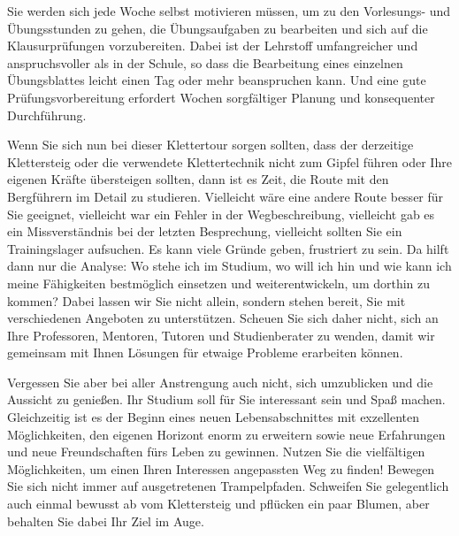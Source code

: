 {    Sie werden sich jede Woche selbst motivieren müssen, um zu den Vorlesungs- und Übungsstunden zu gehen, die Übungsaufgaben zu bearbeiten und sich auf die Klausurprüfungen vorzubereiten. Dabei ist der Lehrstoff umfangreicher und anspruchsvoller als in der Schule, so dass die Bearbeitung eines einzelnen Übungsblattes leicht einen Tag oder mehr beanspruchen kann. Und eine gute Prüfungsvorbereitung erfordert Wochen sorgfältiger Planung und konsequenter Durchführung.

    Wenn Sie sich nun bei dieser Klettertour sorgen sollten, dass der derzeitige Klettersteig oder die verwendete Klettertechnik nicht zum Gipfel führen oder Ihre eigenen Kräfte übersteigen sollten, dann ist es Zeit, die Route mit den Bergführern im Detail zu studieren. Vielleicht wäre eine andere Route besser für Sie geeignet, vielleicht war ein Fehler in der Wegbeschreibung, vielleicht gab es ein Missverständnis bei der letzten Besprechung, vielleicht sollten Sie ein Trainingslager aufsuchen. Es kann viele Gründe geben, frustriert zu sein. Da hilft dann nur die Analyse: Wo stehe ich im Studium, wo will ich hin und wie kann ich meine Fähigkeiten bestmöglich einsetzen und weiterentwickeln, um dorthin zu kommen? Dabei lassen wir Sie nicht allein, sondern stehen bereit, Sie mit verschiedenen Angeboten zu unterstützen. Scheuen Sie sich daher nicht, sich an Ihre Professoren, Mentoren, Tutoren und Studienberater zu wenden, damit wir gemeinsam mit Ihnen Lösungen für etwaige Probleme erarbeiten können.


    Vergessen Sie aber bei aller Anstrengung auch nicht, sich umzublicken und die Aussicht zu genießen. Ihr Studium soll für Sie interessant sein und Spaß machen. Gleichzeitig ist es der Beginn eines neuen Lebensabschnittes mit exzellenten Möglichkeiten, den eigenen Horizont enorm zu erweitern sowie neue Erfahrungen und neue Freundschaften fürs Leben zu gewinnen. Nutzen Sie die vielfältigen Möglichkeiten, um einen Ihren Interessen angepassten Weg zu finden! Bewegen Sie sich nicht immer auf ausgetretenen Trampelpfaden. Schweifen Sie gelegentlich auch einmal bewusst ab vom Klettersteig und pflücken ein paar Blumen, aber behalten Sie dabei Ihr Ziel im Auge.

}
